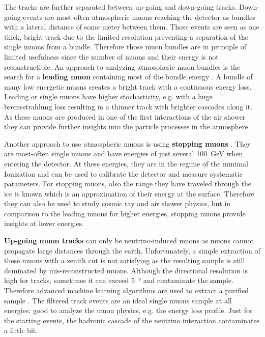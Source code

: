 The tracks are further separated between up-going and down-going tracks.
Down-going events are most-often atmospheric muons reaching the detector as bundles with a lateral distance of some meter between them.
Those events are seen as one thick, bright track due to the limited resolution preventing a separation of the single muons from a bundle.
Therefore those muon bundles are in principle of limited usefulness since the number of muons and their energy is not reconstructible.
An approach to analyzing atmospheric muon bundles is the search for a \textbf{leading muon} containing most of the bundle energy \cite{Fuchs16PhD, Fuchs16ECRS, Werthebach17Master}.
A bundle of many low energetic muons creates a bright track with a continuous energy loss.
Leading or single muons have higher stochasticity, e.g. with a huge bremsstrahlung loss resulting in a thinner track with brighter cascades along it.
As these muons are produced in one of the first interactions of the air shower they can provide further insights into the particle processes in the atmosphere.

Another approach to use atmospheric muons is using \textbf{stopping muons} \cite{Hoinka17Master, Ninfa19Master}.
They are most-often single muons and have energies of just several \SI{100}{GeV} when entering the detector.
At these energies, they are in the regime of the minimal Ionization and can be used to calibrate the detector and measure systematic parameters.
For stopping muons, also the range they have traveled through the ice is known which is an approximation of their energy at the surface.
Therefore they can also be used to study cosmic ray and air shower physics, but in comparison to the leading muons for higher energies, stopping muons provide insights at lower energies.

\textbf{Up-going muon tracks} can only be neutrino-induced muons as muons cannot propagate large distances through the earth.
Unfortunately, a simple extraction of these muons with a zenith cut is not satisfying as the resulting sample is still dominated by mis-reconstructed muons.
Although the directional resolution is high for tracks, sometimes it can exceed \SI{5}{\degree} and contaminate the sample.
Therefore advanced machine learning algorithms are used to extract a purified sample \cite{Stettner19ICRC}.
The filtered track events are an ideal single muons sample at all energies; good to analyze the muon physics, e.g. the energy loss profile.
Just for the starting events, the hadronic cascade of the neutrino interaction contaminates a little bit.

